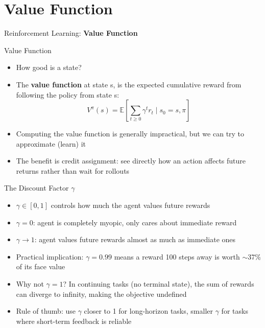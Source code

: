 \section{Value Function}
\begin{frame}{}
    \LARGE Reinforcement Learning: \textbf{Value Function}
\end{frame}

\begin{frame}{Value Function}
\begin{itemize}
    \item How good is a state?
    \pause
    \item The \textbf{value function} at state s, is the expected cumulative reward from following the policy from state s:
    $$V^{\pi}(s) = \mathbb{E} \left [ \sum_{t \geq 0} \gamma^t r_t \mid s_0=s, \pi \right ]$$
    \item Computing the value function is generally impractical, but we can try
to approximate (learn) it
    \item The benefit is credit assignment: see directly how an action affects
future returns rather than wait for rollouts

\end{itemize}

\end{frame}

\begin{frame}{The Discount Factor $\gamma$}
\begin{itemize}
    \item $\gamma \in [0,1]$ controls how much the agent values future rewards
    \item $\gamma = 0$: agent is completely myopic, only cares about immediate reward
    \item $\gamma \rightarrow 1$: agent values future rewards almost as much as immediate ones
    \item Practical implication: $\gamma = 0.99$ means a reward 100 steps away is worth $\sim$37\% of its face value
    \item Why not $\gamma = 1$? In continuing tasks (no terminal state), the sum of rewards can diverge to infinity, making the objective undefined
    \item Rule of thumb: use $\gamma$ closer to 1 for long-horizon tasks, smaller $\gamma$ for tasks where short-term feedback is reliable
\end{itemize}
\end{frame}

